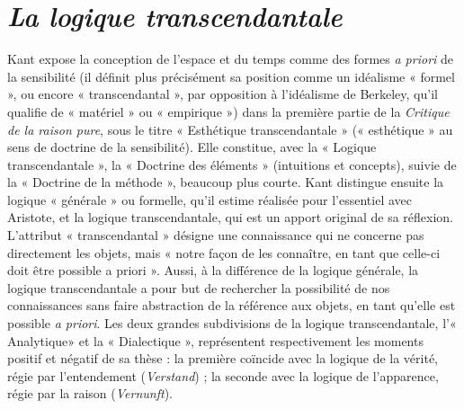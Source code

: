 
\section{{\it La logique transcendantale}}

Kant expose la conception de l’espace
et du temps comme des formes {\it a priori} de
la sensibilité (il définit plus précisément
sa position comme un idéalisme « formel »,
ou encore « transcendantal », par
opposition à l’idéalisme de Berkeley, qu’il
qualifie de « matériel » ou « empirique »)
dans la première partie de la {\it Critique de
la raison pure}, sous le titre « Esthétique
transcendantale » (« esthétique » au sens
de doctrine de la sensibilité). Elle constitue,
avec la « Logique transcendantale »,
la « Doctrine des éléments » (intuitions et
concepts), suivie de la « Doctrine de la
méthode », beaucoup plus courte. Kant
distingue ensuite la logique « générale »
ou formelle, qu’il estime réalisée pour
l'essentiel avec Aristote, et la logique
transcendantale, qui est un apport original
de sa réflexion. L’attribut « transcendantal »
désigne une connaissance qui ne
concerne pas directement les objets, mais
« notre façon de les connaître, en tant que
celle-ci doit être possible {\it }a priori ». Aussi,
à la différence de la logique générale, la
logique transcendantale a pour but de
rechercher la possibilité de nos connaissances
sans faire abstraction de la référence
aux objets, en tant qu’elle est
possible {\it a priori}. Les deux grandes subdivisions
de la logique transcendantale,
l'« Analytique» et la « Dialectique »,
représentent respectivement les moments
positif et négatif de sa thèse : la première
coïncide avec la logique de la vérité, régie
par l’entendement ({\it Verstand}) ; la seconde
avec la logique de l'apparence, régie par
la raison ({\it Vernunft}).

